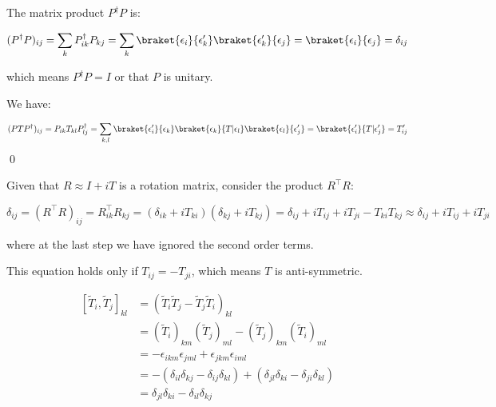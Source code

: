 \documentclass[12pt]{article}
\begin{document}
The matrix product $P^{\dagger} P$ is:

\begin{equation}
    (P^{\dagger} P)_{ij} = \sum_{k} P^{\dagger}_{ik} P_{kj} = \sum_{k} \braket{\epsilon_{i}}{\epsilon'_{k}} \braket{\epsilon'_{k}}{\epsilon_{j}} = \braket{\epsilon_{i}}{\epsilon_{j}} = \delta_{ij}
\end{equation}

which means $P^{\dagger} P = I$ or that $P$ is unitary.

We have:

\begin{equation}
    (PTP^{\dagger})_{ij} = P_{ik} T_{kl} P^{\dagger}_{lj} = \sum_{k, l} \braket{\epsilon'_{i}}{\epsilon_{k}} \braket{\epsilon_{k}}{T|\epsilon_{l}} \braket{\epsilon_{l}}{\epsilon'_{j}} = \braket{\epsilon'_{i}}{T|\epsilon'_{j}} = T'_{ij}
\end{equation}
\qed



Given that $R \approx I + iT$ is a rotation matrix, consider the product $R^{\intercal} R$:

\begin{equation}
    \delta_{ij} = (R^{\intercal} R)_{ij} = R^{\intercal}_{ik} R_{kj} = (\delta_{ik} + i T_{ki})(\delta_{kj} + i T_{kj}) = \delta_{ij} + i T_{ij} + i T_{ji} - T_{ki} T_{kj} \approx \delta_{ij} + i T_{ij} + i T_{ji}
\end{equation}

where at the last step we have ignored the second order terms.

This equation holds only if $T_{ij} = - T_{ji}$, which means $T$ is anti-symmetric.


\begin{equation}
\begin{split}
    [\tilde{T}_{i}, \tilde{T}_{j}]_{kl} &= \left( \tilde{T}_{i} \tilde{T}_{j} - \tilde{T}_{j} \tilde{T}_{i} \right)_{kl} \\
    &= \left( \tilde{T}_{i} \right)_{km} \left( \tilde{T}_{j} \right)_{ml} - \left( \tilde{T}_{j} \right)_{km} \left( \tilde{T}_{i} \right)_{ml} \\
    &= -\epsilon_{ikm} \epsilon_{jml} + \epsilon_{jkm} \epsilon_{iml} \\
    &= -(\delta_{il} \delta_{kj} - \delta_{ij} \delta_{kl}) + (\delta_{jl} \delta_{ki} - \delta_{ji} \delta_{kl}) \\
    &= \delta_{jl} \delta_{ki} - \delta_{il} \delta_{kj}
\end{split}
\end{equation}
\end{document}
